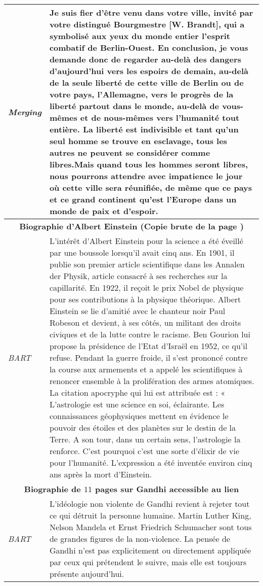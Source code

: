 \begin{center}
\begin{longtable}{|p{3cm}|p{13cm}|}
\hline
\textit{Merging} & Je suis fier d'être venu dans votre ville, invité par votre distingué Bourgmestre [W. Brandt], qui a symbolisé aux yeux du monde entier l'esprit combatif de Berlin-Ouest. En conclusion, je vous demande donc de regarder au-delà des dangers d'aujourd'hui vers les espoirs de demain, au-delà de la seule liberté de cette ville de Berlin ou de votre pays, l'Allemagne, vers le progrès de la liberté partout dans le monde, au-delà de vous-mêmes et de nous-mêmes vers l'humanité tout entière. La liberté est indivisible et tant qu'un seul homme se trouve en esclavage, tous les autres ne peuvent se considérer comme libres.Mais quand tous les hommes seront libres, nous pourrons attendre avec impatience le jour où cette ville sera réunifiée, de même que ce pays et ce grand continent qu'est l'Europe dans un monde de paix et d'espoir.  \\
\hline
\hline
\multicolumn{2}{|c|}{{\textbf{Biographie d'Albert Einstein (Copie brute de la page \cite{WikiEins})}}}\\
\hline
\textit{BART} & L'intérêt d'Albert Einstein pour la science a été éveillé par une boussole lorsqu'il avait cinq ans. En 1901, il publie son premier article scientifique dans les Annalen der Physik, article consacré à ses recherches sur la capillarité. En 1922, il reçoit le prix Nobel de physique pour ses contributions à la physique théorique. Albert Einstein se lie d'amitié avec le chanteur noir Paul Robeson et devient, à ses côtés, un militant des droits civiques et de la lutte contre le racisme. Ben Gourion lui propose la présidence de l'Etat d'Israël en 1952, ce qu'il refuse. Pendant la guerre froide, il s'est prononcé contre la course aux armements et a appelé les scientifiques à renoncer ensemble à la prolifération des armes atomiques. La citation apocryphe qui lui est attribuée est : « L'astrologie est une science en soi, éclairante. Les connaissances géophysiques mettent en évidence le pouvoir des étoiles et des planètes sur le destin de la Terre. A son tour, dans un certain sens, l'astrologie la renforce. C'est pourquoi c'est une sorte d'élixir de vie pour l'humanité. L'expression a été inventée environ cinq ans après la mort d'Einstein.\\
\hline
\hline
\multicolumn{2}{|c|}{{\textbf{Biographie de $ 11 $ pages sur Gandhi accessible au lien \cite{TPsurGandhi}}}}\\
\hline
\textit{BART} & L'idéologie non violente de Gandhi revient à rejeter tout ce qui détruit la personne humaine. Martin Luther King, Nelson Mandela et Ernst Friedrich Schumacher sont tous de grandes figures de la non-violence. La pensée de Gandhi n'est pas explicitement ou directement appliquée par ceux qui prétendent le suivre, mais elle est toujours présente aujourd'hui.\\
\hline
\hline

\end{longtable}
\end{center}
